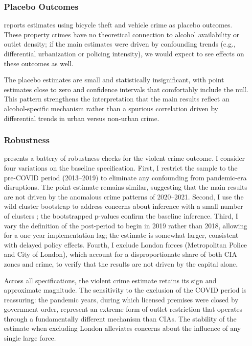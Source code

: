 \documentclass[12pt]{article}
\begin{document}
\subsubsection*{Placebo Outcomes}  reports estimates using bicycle theft and vehicle crime as placebo outcomes. These property crimes have no theoretical connection to alcohol availability or outlet density; if the main estimates were driven by confounding trends (e.g., differential urbanization or policing intensity), we would expect to see effects on these outcomes as well.



The placebo estimates are small and statistically insignificant, with point estimates close to zero and confidence intervals that comfortably include the null. This pattern strengthens the interpretation that the main results reflect an alcohol-specific mechanism rather than a spurious correlation driven by differential trends in urban versus non-urban crime.

\subsubsection*{Robustness}  presents a battery of robustness checks for the violent crime outcome. I consider four variations on the baseline specification. First, I restrict the sample to the pre-COVID period (2013--2019) to eliminate any confounding from pandemic-era disruptions. The point estimate remains similar, suggesting that the main results are not driven by the anomalous crime patterns of 2020--2021. Second, I use the wild cluster bootstrap to address concerns about inference with a small number of clusters \citep{cameron2008bootstrap}; the bootstrapped p-values confirm the baseline inference. Third, I vary the definition of the post-period to begin in 2019 rather than 2018, allowing for a one-year implementation lag; the estimate is somewhat larger, consistent with delayed policy effects. Fourth, I exclude London forces (Metropolitan Police and City of London), which account for a disproportionate share of both CIA zones and crime, to verify that the results are not driven by the capital alone.



Across all specifications, the violent crime estimate retains its sign and approximate magnitude. The sensitivity to the exclusion of the COVID period is reassuring: the pandemic years, during which licensed premises were closed by government order, represent an extreme form of outlet restriction that operates through a fundamentally different mechanism than CIAs. The stability of the estimate when excluding London alleviates concerns about the influence of any single large force.
\end{document}
